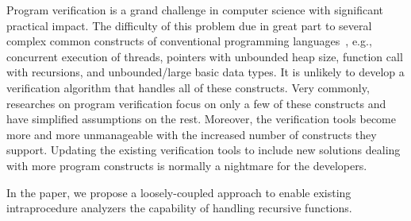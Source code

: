 Program verification is a grand challenge in computer science with significant practical impact. 
The difficulty of this problem due in great part to several complex common constructs of conventional programming languages~\cite{ClarkeJS05}, e.g., concurrent execution of threads, pointers with unbounded heap size, function call with recursions, and unbounded/large basic data types. It is unlikely to develop a verification algorithm that handles all of these constructs. Very commonly, researches on program verification focus on only a few of these constructs and have simplified assumptions on the rest. Moreover, the verification tools become more and more unmanageable with the increased number of constructs they support. Updating the existing verification tools to include new solutions dealing with more program constructs is normally a nightmare for the developers.

In the paper, we propose a loosely-coupled approach to enable existing intraprocedure analyzers the capability of handling recursive functions. 


